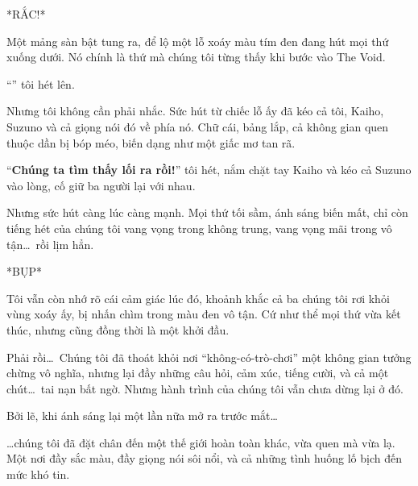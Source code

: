 \documentclass[../main.tex]{subfiles}
\begin{document}
*RẮC!*

Một mảng sàn bật tung ra, để lộ một lỗ xoáy màu tím đen đang hút mọi thứ xuống dưới. Nó chính là thứ mà chúng tôi từng thấy khi bước vào The Void.

``\textbf{}'' tôi hét lên.

Nhưng tôi không cần phải nhắc. Sức hút từ chiếc lỗ ấy đã kéo cả tôi, Kaiho, Suzuno và cả giọng nói đó về phía nó. Chữ cái, bảng lắp, cả không gian quen thuộc dần bị bóp méo, biến dạng như một giấc mơ tan rã.

``\textbf{Chúng ta tìm thấy lối ra rồi!}'' tôi hét, nắm chặt tay Kaiho và kéo cả Suzuno vào lòng, cố giữ ba người lại với nhau.

Nhưng sức hút càng lúc càng mạnh. Mọi thứ tối sầm, ánh sáng biến mất, chỉ còn tiếng hét của chúng tôi vang vọng trong không trung, vang vọng mãi trong vô tận\dots\ rồi lịm hẳn.

*BỤP*

\il

Tôi vẫn còn nhớ rõ cái cảm giác lúc đó, khoảnh khắc cả ba chúng tôi rơi khỏi vùng xoáy ấy, bị nhấn chìm trong màu đen vô tận. Cứ như thể mọi thứ vừa kết thúc, nhưng cũng đồng thời là một khởi đầu.

Phải rồi\dots\ Chúng tôi đã thoát khỏi nơi ``không-có-trò-chơi'' một không gian tưởng chừng vô nghĩa, nhưng lại đầy những câu hỏi, cảm xúc, tiếng cười, và cả một chút\dots\ tai nạn bất ngờ. Nhưng hành trình của chúng tôi vẫn chưa dừng lại ở đó.

Bởi lẽ, khi ánh sáng lại một lần nữa mở ra trước mắt\dots

\dots chúng tôi đã đặt chân đến một thế giới hoàn toàn khác, vừa quen mà vừa lạ. Một nơi đầy sắc màu, đầy giọng nói sôi nổi, và cả những tình huống lố bịch đến mức khó tin.



\end{document}
